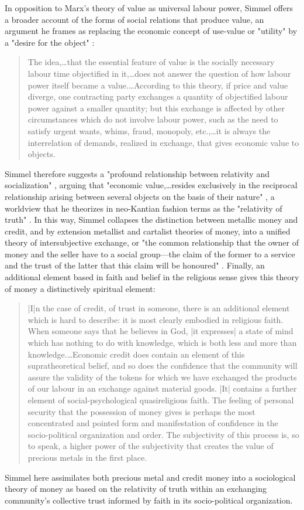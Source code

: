In opposition to Marx's theory of value as universal labour power, Simmel offers a broader account of the forms of social relations that produce value, an argument he frames as replacing the economic concept of use-value or "utility" by a "desire for the object" \autocite[88]{Simmel04}:
\blockcquote[93--4]{Simmel04}{
  The idea,…that the essential feature of value is the socially necessary labour time objectified in it,…does not answer the question of how labour power itself became a value.…According to this theory, if price and value diverge, one contracting party exchanges a quantity of objectified labour power against a smaller quantity; but this exchange is affected by other circumstances which do not involve labour power, such as the need to satisfy urgent wants, whims, fraud, monopoly, etc.,…it is always the interrelation of demands, realized in exchange, that gives economic value to objects.
}
Simmel therefore suggests a "profound relationship between relativity and socialization" \autocite[99]{Simmel04}, arguing that "economic value,…resides exclusively in the reciprocal relationship arising between several objects on the basis of their nature" \autocite[99]{Simmel04}, a worldview that he theorizes in neo-Kantian fashion terms as the "relativity of truth" \autocite[114]{Simmel04}.  In this way, Simmel collapses the distinction between metallic money and credit, and by extension metallist and cartalist theories of money, into a unified theory of intersubjective exchange, or "the common relationship that the owner of money and the seller have to a social group---the claim of the former to a service and the trust of the latter that this claim will be honoured" \autocite[177]{Simmel04}. Finally, an additional element based in faith and belief in the religious sense gives this theory of money a distinctively spiritual element:
\blockcquote[178]{Simmel04}{
  |I|n the case of credit, of trust in someone, there is an additional element which is hard to describe: it is most clearly embodied in religious faith. When someone says that he believes in God, |it expresses| a state of mind which has nothing to do with knowledge, which is both less and more than knowledge.…Economic credit does contain an element of this supratheoretical belief, and so does the confidence that the community will assure the validity of the tokens for which we have exchanged the products of our labour in an exchange against material goods. |It| contains a further element of social-psychological quasireligious faith. The feeling of personal security that the possession of money gives is perhaps the most concentrated and pointed form and manifestation of confidence in the socio-political organization and order. The subjectivity of this process is, so to speak, a higher power of the subjectivity that creates the value of precious metals in the first place.
}
Simmel here assimilates both precious metal and credit money into a sociological theory of money as based on the relativity of truth within an exchanging community's collective trust informed by faith in its socio-political organization.


